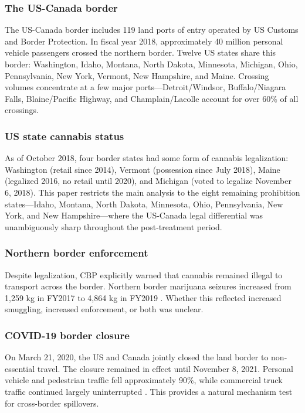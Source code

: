 \documentclass[12pt]{article}
\begin{document}
\subsubsection*{The US-Canada border} The US-Canada border includes 119 land ports of entry operated by US Customs and Border Protection. In fiscal year 2018, approximately 40 million personal vehicle passengers crossed the northern border. Twelve US states share this border: Washington, Idaho, Montana, North Dakota, Minnesota, Michigan, Ohio, Pennsylvania, New York, Vermont, New Hampshire, and Maine. Crossing volumes concentrate at a few major ports---Detroit/Windsor, Buffalo/Niagara Falls, Blaine/Pacific Highway, and Champlain/Lacolle account for over 60\% of all crossings.

\subsubsection*{US state cannabis status} As of October 2018, four border states had some form of cannabis legalization: Washington (retail since 2014), Vermont (possession since July 2018), Maine (legalized 2016, no retail until 2020), and Michigan (voted to legalize November 6, 2018). This paper restricts the main analysis to the eight remaining prohibition states---Idaho, Montana, North Dakota, Minnesota, Ohio, Pennsylvania, New York, and New Hampshire---where the US-Canada legal differential was unambiguously sharp throughout the post-treatment period.

\subsubsection*{Northern border enforcement} Despite legalization, CBP explicitly warned that cannabis remained illegal to transport across the border. Northern border marijuana seizures increased from 1,259 kg in FY2017 to 4,864 kg in FY2019 \citep{cbp2021}. Whether this reflected increased smuggling, increased enforcement, or both was unclear.

\subsubsection*{COVID-19 border closure} On March 21, 2020, the US and Canada jointly closed the land border to non-essential travel. The closure remained in effect until November 8, 2021. Personal vehicle and pedestrian traffic fell approximately 90\%, while commercial truck traffic continued largely uninterrupted \citep{cook2020}. This provides a natural mechanism test for cross-border spillovers.
\end{document}
